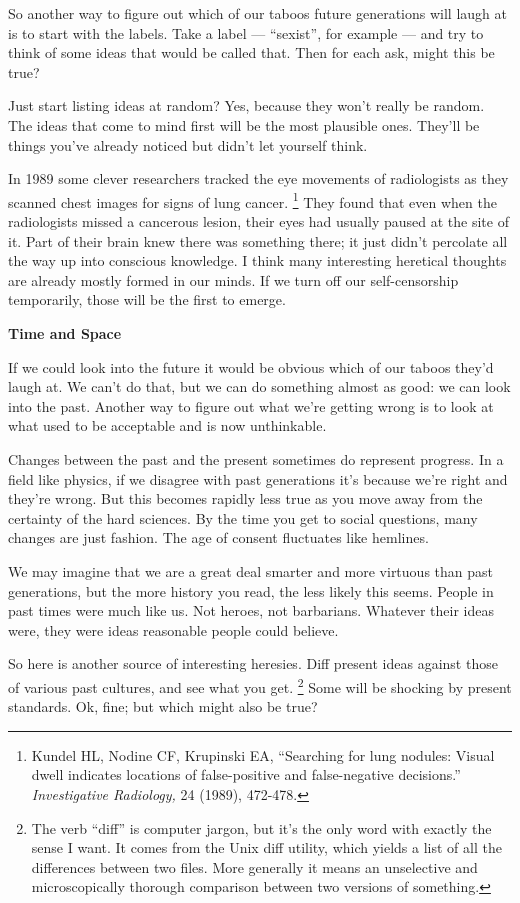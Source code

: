 \documentclass[12pt]{book}
\begin{document}
So another way to figure out which of our taboos future generations will
laugh at is to start with the labels. Take a label --- ``sexist'', for
example --- and try to think of some ideas that would be called that.
Then for each ask, might this be true?

Just start listing ideas at random? Yes, because they won't really be
random. The ideas that come to mind first will be the most plausible
ones. They'll be things you've already noticed but didn't let yourself
think.

In 1989 some clever researchers tracked the eye movements of
radiologists as they scanned chest images for signs of lung cancer.
\footnote{Kundel HL, Nodine CF, Krupinski EA, ``Searching for lung
nodules: Visual dwell indicates locations of false-positive and
false-negative decisions.'' \emph{Investigative Radiology,} 24 (1989),
472-478.} They found that even when the radiologists missed a cancerous
lesion, their eyes had usually paused at the site of it. Part of their
brain knew there was something there; it just didn't percolate all the
way up into conscious knowledge. I think many interesting heretical
thoughts are already mostly formed in our minds. If we turn off our
self-censorship temporarily, those will be the first to emerge.

\textbf{Time and Space}

If we could look into the future it would be obvious which of our taboos
they'd laugh at. We can't do that, but we can do something almost as
good: we can look into the past. Another way to figure out what we're
getting wrong is to look at what used to be acceptable and is now
unthinkable.

Changes between the past and the present sometimes do represent
progress. In a field like physics, if we disagree with past generations
it's because we're right and they're wrong. But this becomes rapidly
less true as you move away from the certainty of the hard sciences. By
the time you get to social questions, many changes are just fashion. The
age of consent fluctuates like hemlines.

We may imagine that we are a great deal smarter and more virtuous than
past generations, but the more history you read, the less likely this
seems. People in past times were much like us. Not heroes, not
barbarians. Whatever their ideas were, they were ideas reasonable people
could believe.

So here is another source of interesting heresies. Diff present ideas
against those of various past cultures, and see what you get. \footnote{The verb ``diff'' is computer jargon, but it's the only word
with exactly the sense I want. It comes from the Unix diff utility,
which yields a list of all the differences between two files. More
generally it means an unselective and microscopically thorough
comparison between two versions of something.}
Some will be shocking by present standards. Ok, fine; but which might
also be true?
\end{document}
